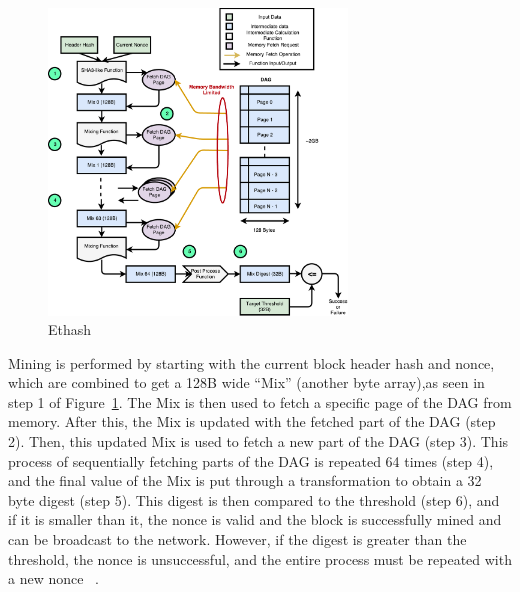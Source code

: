 \documentclass[runningheads]{llncs}
\begin{document}
\begin{figure}[h]
\centering
\includegraphics[width=300px,keepaspectratio]{Ethash.pdf}
\caption{\label{fig:ethash} Ethash}
\end{figure}

Mining is performed by starting with the current block header hash and nonce, which are combined to get a 128B wide ``Mix'' (another byte array),as seen in step 1 of Figure~\ref{fig:ethash}. The Mix is then used to fetch a specific page of the DAG from memory. After this, the Mix is updated with the fetched part of the DAG (step 2). Then, this updated Mix is used to fetch a new part of the DAG (step 3). This process of sequentially fetching parts of the DAG is repeated 64 times (step 4), and the final value of the Mix is put through a transformation to obtain a 32 byte digest (step 5). This digest is then compared to the threshold (step 6), and if it is smaller than it, the nonce is valid and the block is successfully mined and can be broadcast to the network. However, if the digest is greater than the threshold, the nonce is unsuccessful, and the entire process must be repeated with a new nonce ~\cite{Ethmining}. 

\end{document}
